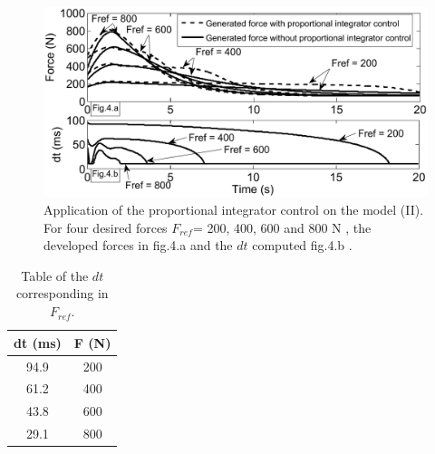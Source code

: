 \documentclass[10pt,twocolumn,letterpaper, 
]{article}
\begin{document}
\begin{figure}[t]
	\centering
 		\includegraphics[width=\columnwidth]{ctrlfatiguepi200_800moyene.pdf}
 	\caption{Application of the proportional integrator control on the model (II). For four desired forces $F_{ref}$= 200, 400, 600 and 800 N , the developed forces in fig.4.a and the $dt$ computed fig.4.b .}
	\label{fig:ctrlfatiguepi200_800moyene}
	\end{figure}
	

	\begin{table}[t]
	\centering
	\caption{Table of the $dt$ corresponding in $F_{ref}$.}
		\begin{tabular}{|c|c|}
		\hline
			dt (ms) & F (N) \\
			\hline
			94.9 & 200 \\
			61.2 & 400 \\
			43.8 & 600 \\
			29.1 & 800 \\
		\hline 
		\end{tabular}
		\vspace{-0.5cm}
\end{table}
\end{document}
